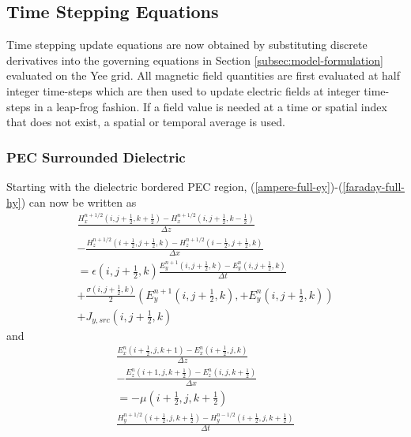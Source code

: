 \subsection{Time Stepping Equations}
\label{subsec:timestepeqs}
Time stepping update equations are now obtained by substituting discrete derivatives into the governing equations in Section \ref{subsec:model-formulation} evaluated on the Yee grid. All magnetic field quantities are first evaluated at half integer time-steps which are then used to update electric fields at integer time-steps in a leap-frog fashion. If a field value is needed at a time or spatial index that does not exist, a spatial or temporal average is used.

\subsubsection{PEC Surrounded Dielectric}
\label{subsubsec:pec-time}
Starting with the dielectric bordered PEC region, (\ref{ampere-full-ey})-(\ref{faraday-full-hy}) can now be written as
\begin{multline}
	\frac{H_x^{n+1/2}(i,j+\frac{1}{2},k+\frac{1}{2}) - H_x^{n+1/2}(i,j+\frac{1}{2},k-\frac{1}{2})}{\Delta z} \\ - \frac{H_z^{n+1/2}(i+\frac{1}{2},j+\frac{1}{2},k) - H_z^{n+1/2}(i-\frac{1}{2},j+\frac{1}{2},k)}{\Delta x} \\ = \epsilon(i,j+\tfrac{1}{2},k)\frac{E_y^{n+1}(i,j+\frac{1}{2},k) - E_y^{n}(i,j+\frac{1}{2},k)}{\Delta t} \\ + \frac{\sigma(i,j+\tfrac{1}{2},k)}{2}(E_y^{n+1}(i,j+\tfrac{1}{2},k),+E_y^{n}(i,j+\tfrac{1}{2},k)) \\ + J_{y,src}(i,j+\tfrac{1}{2},k)
	\label{eq:discrete-faraday}
\end{multline}
and
\begin{multline}
	\frac{E_x^n(i+\tfrac{1}{2},j,k+1)-E_x^n(i+\tfrac{1}{2},j,k)}{\Delta z} \\ - \frac{E_z^n(i+1,j,k+\tfrac{1}{2}) - E_z^n(i,j,k+\tfrac{1}{2})}{\Delta x} \\ =-\mu(i+\tfrac{1}{2},j,k+\tfrac{1}{2}) \\ \frac{H_y^{n+1/2}(i+\tfrac{1}{2},j,k+\tfrac{1}{2})-H_y^{n-1/2}(i+\tfrac{1}{2},j,k+\tfrac{1}{2})}{\Delta t}
	\label{eq:discrete-ampere}
\end{multline}

